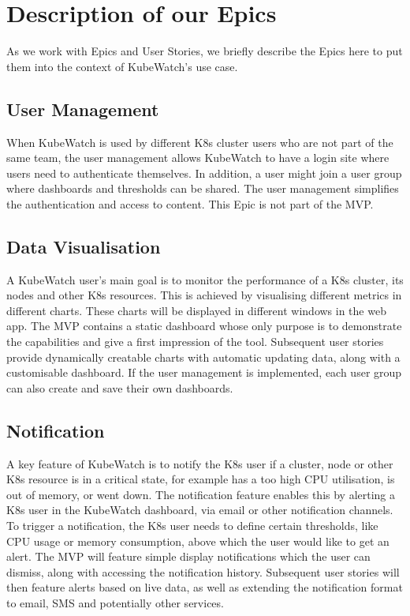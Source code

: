 \section{Description of our Epics}

As we work with Epics and User Stories, we briefly describe the Epics here to put them into the context of KubeWatch's use case.

\subsection{User Management}
When KubeWatch is used by different K8s cluster users who are not part of the same team, the user management allows KubeWatch to have a login site where users need to authenticate themselves. In addition, a user might join a user group where dashboards and thresholds can be shared. The user management simplifies the authentication and access to content. This Epic is not part of the MVP.

\subsection{Data Visualisation}
A KubeWatch user's main goal is to monitor the performance of a K8s cluster, its nodes and other K8s resources. This is achieved by visualising different metrics in different charts. These charts will be displayed in different windows in the web app. The MVP contains a static dashboard whose only purpose is to demonstrate the capabilities and give a first impression of the tool. Subsequent user stories provide dynamically creatable charts with automatic updating data, along with a customisable dashboard. If the user management is implemented, each user group can also create and save their own dashboards.

\subsection{Notification}
A key feature of KubeWatch is to notify the K8s user if a cluster, node or other K8s resource is in a critical state, for example has a too high CPU utilisation, is out of memory, or went down. The notification feature enables this by alerting a K8s user in the KubeWatch dashboard, via email or other notification channels. To trigger a notification, the K8s user needs to define certain thresholds, like CPU usage or memory consumption, above which the user would like to get an alert. The MVP will feature simple display notifications which the user can dismiss, along with accessing the notification history. Subsequent user stories will then feature alerts based on live data, as well as extending the notification format to email, SMS and potentially other services.

